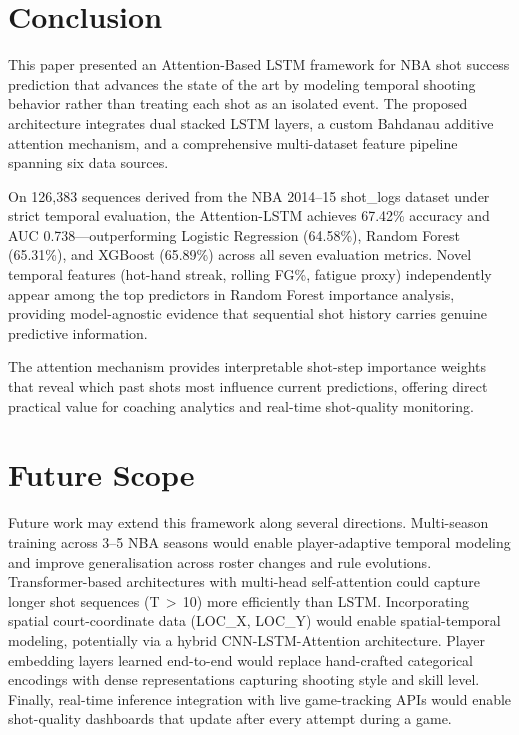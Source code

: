 \documentclass[conference]{IEEEtran}
\begin{document}
\section{Conclusion}

This paper presented an Attention-Based LSTM framework for NBA shot success
prediction that advances the state of the art by modeling temporal
shooting behavior rather than treating each shot as an isolated event.
The proposed architecture integrates dual stacked LSTM layers, a custom
Bahdanau additive attention mechanism, and a comprehensive multi-dataset
feature pipeline spanning six data sources.

On 126{,}383 sequences derived from the NBA 2014--15 shot\_logs dataset
under strict temporal evaluation, the Attention-LSTM achieves 67.42\%
accuracy and AUC 0.738—outperforming Logistic Regression (64.58\%),
Random Forest (65.31\%), and XGBoost (65.89\%) across all seven
evaluation metrics.  Novel temporal features (hot-hand streak, rolling
FG\%, fatigue proxy) independently appear among the top predictors in
Random Forest importance analysis, providing model-agnostic evidence
that sequential shot history carries genuine predictive information.

The attention mechanism provides interpretable shot-step importance
weights that reveal which past shots most influence current predictions,
offering direct practical value for coaching analytics and real-time
shot-quality monitoring.

\section{Future Scope}

Future work may extend this framework along several directions.
Multi-season training across 3--5 NBA seasons would enable player-adaptive
temporal modeling and improve generalisation across roster changes and
rule evolutions.  Transformer-based architectures with multi-head
self-attention could capture longer shot sequences (T\,$>$\,10) more
efficiently than LSTM.  Incorporating spatial court-coordinate data
(LOC\_X, LOC\_Y) would enable spatial-temporal modeling, potentially
via a hybrid CNN-LSTM-Attention architecture.  Player embedding layers
learned end-to-end would replace hand-crafted categorical encodings
with dense representations capturing shooting style and skill level.
Finally, real-time inference integration with live game-tracking APIs
would enable shot-quality dashboards that update after every attempt
during a game.
\end{document}
